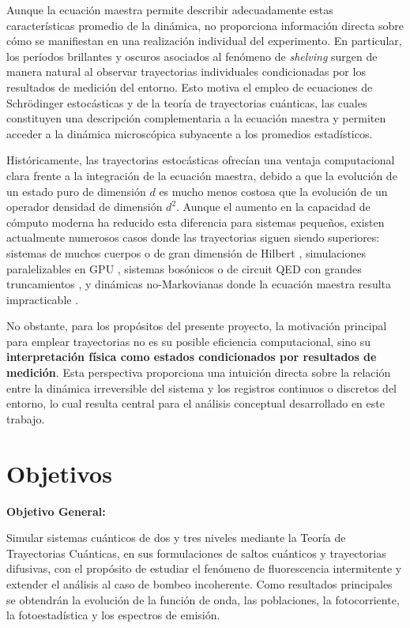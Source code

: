 \documentclass[12pt]{article}
\begin{document}
Aunque la ecuación maestra permite describir adecuadamente estas características promedio de la dinámica, no proporciona información directa sobre cómo se manifiestan en una realización individual del experimento. En particular, los períodos brillantes y oscuros asociados al fenómeno de \textit{shelving} surgen de manera natural al observar trayectorias individuales condicionadas por los resultados de medición del entorno. Esto motiva el empleo de ecuaciones de Schrödinger estocásticas y de la teoría de trayectorias cuánticas, las cuales constituyen una descripción complementaria a la ecuación maestra y permiten acceder a la dinámica microscópica subyacente a los promedios estadísticos.

Históricamente, las trayectorias estocásticas ofrecían una ventaja computacional clara frente a la integración de la ecuación maestra, debido a que la evolución de un estado puro de dimensión $d$ es mucho menos costosa que la evolución de un operador densidad de dimensión $d^2$.  
Aunque el aumento en la capacidad de cómputo moderna ha reducido esta diferencia para sistemas pequeños, existen actualmente numerosos casos donde las trayectorias siguen siendo superiores: sistemas de muchos cuerpos o de gran dimensión de Hilbert \cite{Daley2014,Lindner2022}, simulaciones paralelizables en GPU \cite{Li2022}, sistemas bosónicos o de circuit QED con grandes truncamientos \cite{Koch2019}, y dinámicas no-Markovianas donde la ecuación maestra resulta impracticable \cite{Suess2014,Ke2021}.

No obstante, para los propósitos del presente proyecto, la motivación principal para emplear trayectorias no es su posible eficiencia computacional, sino su \textbf{interpretación física como estados condicionados por resultados de medición}. Esta perspectiva proporciona una intuición directa sobre la relación entre la dinámica irreversible del sistema y los registros continuos o discretos del entorno, lo cual resulta central para el análisis conceptual desarrollado en este trabajo.







\section{Objetivos}
\textbf{Objetivo General:}

Simular sistemas cuánticos de dos y tres niveles mediante la Teoría de Trayectorias Cuánticas, en sus formulaciones de saltos cuánticos y trayectorias difusivas, con el propósito de estudiar el fenómeno de fluorescencia intermitente y extender el análisis al caso de bombeo incoherente. Como resultados principales se obtendrán la evolución de la función de onda, las poblaciones, la fotocorriente, la fotoestadística y los espectros de emisión.
\end{document}
